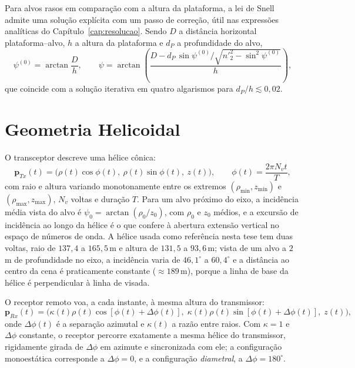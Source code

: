 \documentclass[12pt,a4paper,oneside]{book}
\theoremstyle{remark}
\newcommand{\vect}[1]{\boldsymbol{#1}}
\theoremstyle{plain}
\theoremstyle{definition}
\begin{document}
Para alvos rasos em comparação com a altura da plataforma, a lei de Snell
admite uma solução explícita com um passo de correção, útil nas expressões
analíticas do Capítulo~\ref{cap:resolucao}. Sendo $D$ a distância horizontal
plataforma--alvo, $h$ a altura da plataforma e $d_P$ a profundidade do alvo,
\begin{equation}
  \psi^{(0)}=\arctan\frac{D}{h},\qquad
  \psi=\arctan\!\left(\frac{D-d_P\,\sin\psi^{(0)}\big/\sqrt{n'^2_2-\sin^2\psi^{(0)}}}{h}\right),
  \label{eq:snell_explicita}
\end{equation}
que coincide com a solução iterativa em quatro algarismos para
$d_P/h\lesssim0,02$.

\section{Geometria Helicoidal}
\label{sec:fund_sar_bist}

O transceptor descreve uma hélice cônica:
\begin{equation}
  \vect p_{Tx}(t)=\big(\rho(t)\cos\phi(t),\ \rho(t)\sin\phi(t),\ z(t)\big),\qquad
  \phi(t)=\frac{2\pi N_v t}{T},
  \label{eq:helix}
\end{equation}
com raio e altura variando monotonamente entre os extremos
$(\rho_{\min},z_{\min})$ e $(\rho_{\max},z_{\max})$, $N_v$ voltas e duração $T$.
Para um alvo próximo do eixo, a incidência média vista do alvo é
$\psi_0 = \arctan(\rho_0/z_0)$, com $\rho_0$ e $z_0$ médios, e a excursão de
incidência ao longo da hélice é o que confere à abertura extensão vertical no
espaço de números de onda. A hélice usada como referência nesta tese tem duas
voltas, raio de $137,4$ a $165,5\,$m e altura de $131,5$ a $93,6\,$m; vista de
um alvo a $2\,$m de profundidade no eixo, a incidência varia de $46,1^\circ$ a
$60,4^\circ$ e a distância ao centro da cena é praticamente constante
($\approx189\,$m), porque a linha de base da hélice é perpendicular à linha de
visada.

O receptor remoto voa, a cada instante, à mesma altura do transmissor:
\begin{equation}
  \vect p_{Rx}(t) = \Big(\kappa(t)\rho(t)\cos[\phi(t)+\Delta\phi(t)],\;
  \kappa(t)\rho(t)\sin[\phi(t)+\Delta\phi(t)],\; z(t)\Big),
  \label{eq:rx_traj}
\end{equation}
onde $\Delta\phi(t)$ é a separação azimutal e $\kappa(t)$ a razão entre raios.
Com $\kappa=1$ e $\Delta\phi$ constante, o receptor percorre exatamente a mesma
hélice do transmissor, rigidamente girada de $\Delta\phi$ em azimute e
sincronizada com ele; a configuração monoestática corresponde a $\Delta\phi=0$,
e a configuração \emph{diametral}, a $\Delta\phi=180^\circ$.
\end{document}
